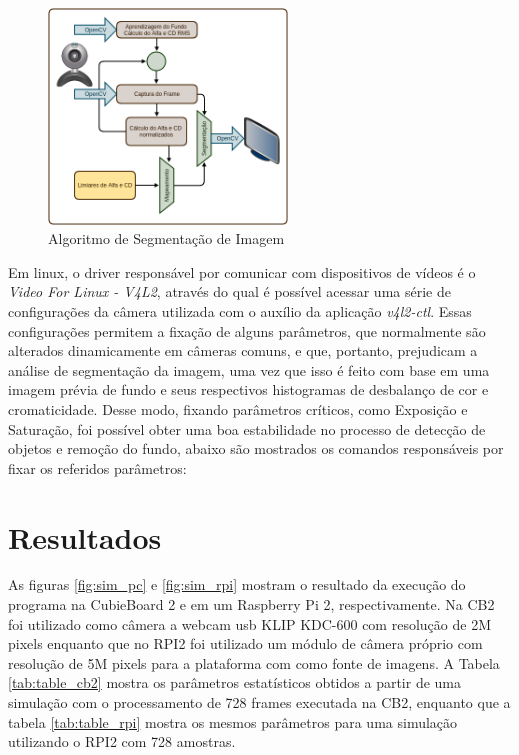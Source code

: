\documentclass[conference]{IEEEtran}
\begin{document}


\begin{figure}[!t]
\centering
\includegraphics[width=2.5in]{Algoritmo}
\caption{Algoritmo de Segmentação de Imagem}
\label{fig:algoritmo}
\end{figure}

Em linux, o driver responsável por comunicar com dispositivos de vídeos é o \textit{Video For Linux - V4L2}, através do qual é possível acessar uma série de configurações da câmera utilizada com o auxílio da aplicação \textit{v4l2-ctl}. Essas configurações permitem a fixação de alguns parâmetros, que normalmente são alterados dinamicamente em câmeras comuns, e que, portanto, prejudicam a análise de segmentação da imagem, uma vez que isso é feito com base em uma imagem prévia de fundo e seus respectivos histogramas de desbalanço de cor e cromaticidade. Desse modo, fixando parâmetros críticos, como Exposição e Saturação, foi possível obter uma boa estabilidade no processo de detecção de objetos e remoção do fundo, abaixo são mostrados os comandos responsáveis por fixar os referidos parâmetros:



\section{Resultados}
As figuras \ref{fig:sim_pc} e \ref{fig:sim_rpi} mostram o resultado da execução do programa na CubieBoard 2 e em um Raspberry Pi 2, respectivamente. Na CB2 foi utilizado como câmera a webcam usb KLIP KDC-600 com resolução de 2M pixels enquanto que no RPI2 foi utilizado um módulo de câmera próprio com resolução de 5M pixels para a plataforma com como fonte de imagens. A Tabela \ref{tab:table_cb2} mostra os parâmetros estatísticos obtidos a partir de uma simulação com o processamento de 728 frames executada na CB2, enquanto que  a tabela \ref{tab:table_rpi} mostra os mesmos parâmetros para uma simulação utilizando o RPI2 com 728 amostras.
\end{document}
